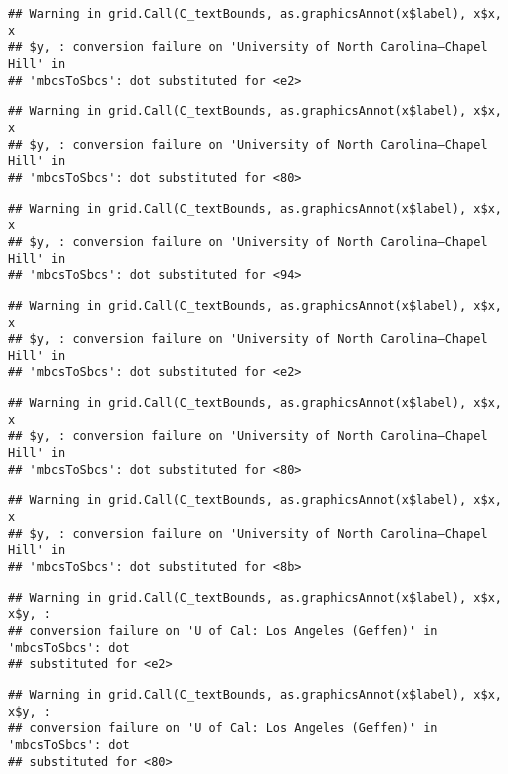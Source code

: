 \documentclass[]{article}
\begin{document}
\begin{verbatim}
## Warning in grid.Call(C_textBounds, as.graphicsAnnot(x$label), x$x, x
## $y, : conversion failure on 'University of North Carolina—​Chapel Hill' in
## 'mbcsToSbcs': dot substituted for <e2>
\end{verbatim}

\begin{verbatim}
## Warning in grid.Call(C_textBounds, as.graphicsAnnot(x$label), x$x, x
## $y, : conversion failure on 'University of North Carolina—​Chapel Hill' in
## 'mbcsToSbcs': dot substituted for <80>
\end{verbatim}

\begin{verbatim}
## Warning in grid.Call(C_textBounds, as.graphicsAnnot(x$label), x$x, x
## $y, : conversion failure on 'University of North Carolina—​Chapel Hill' in
## 'mbcsToSbcs': dot substituted for <94>
\end{verbatim}

\begin{verbatim}
## Warning in grid.Call(C_textBounds, as.graphicsAnnot(x$label), x$x, x
## $y, : conversion failure on 'University of North Carolina—​Chapel Hill' in
## 'mbcsToSbcs': dot substituted for <e2>
\end{verbatim}

\begin{verbatim}
## Warning in grid.Call(C_textBounds, as.graphicsAnnot(x$label), x$x, x
## $y, : conversion failure on 'University of North Carolina—​Chapel Hill' in
## 'mbcsToSbcs': dot substituted for <80>
\end{verbatim}

\begin{verbatim}
## Warning in grid.Call(C_textBounds, as.graphicsAnnot(x$label), x$x, x
## $y, : conversion failure on 'University of North Carolina—​Chapel Hill' in
## 'mbcsToSbcs': dot substituted for <8b>
\end{verbatim}

\begin{verbatim}
## Warning in grid.Call(C_textBounds, as.graphicsAnnot(x$label), x$x, x$y, :
## conversion failure on 'U of Cal: ​Los Angeles (Geffen)' in 'mbcsToSbcs': dot
## substituted for <e2>
\end{verbatim}

\begin{verbatim}
## Warning in grid.Call(C_textBounds, as.graphicsAnnot(x$label), x$x, x$y, :
## conversion failure on 'U of Cal: ​Los Angeles (Geffen)' in 'mbcsToSbcs': dot
## substituted for <80>
\end{verbatim}
\end{document}
